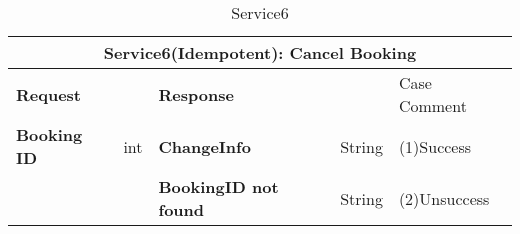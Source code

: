 \begin{spacing}{1}
\begin{table}[h!]
\centering
\begin{tabular}{|l|l|l|l|l|}
\hline
\multicolumn{5}{|c|}{Service6(Idempotent): Cancel Booking} \\ \hline
\multicolumn{2}{|l|}{\textbf{Request}} & \multicolumn{2}{l|}{\textbf{Response}} & Case Comment \\ \hline
\textbf{Booking ID} & int & \textbf{ChangeInfo} & String & (1)Success \\ \hline
 &  & \textbf{BookingID not found} & String & (2)Unsuccess \\ \hline
\end{tabular}
\caption{Service6}
\end{table}
\end{spacing}
\newpage
